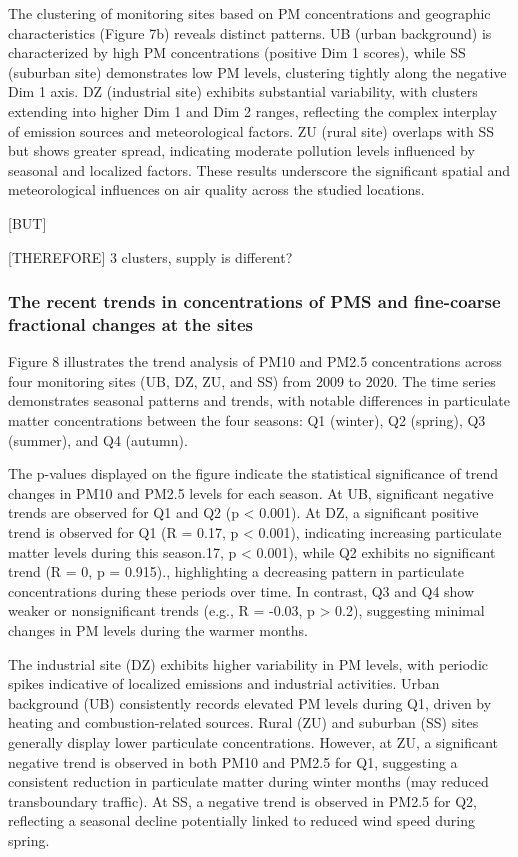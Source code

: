 \documentclass[
  11pt,
]{article}
\begin{document}
The clustering of monitoring sites based on PM concentrations and
geographic characteristics (Figure 7b) reveals distinct patterns. UB
(urban background) is characterized by high PM concentrations (positive
Dim 1 scores), while SS (suburban site) demonstrates low PM levels,
clustering tightly along the negative Dim 1 axis. DZ (industrial site)
exhibits substantial variability, with clusters extending into higher
Dim 1 and Dim 2 ranges, reflecting the complex interplay of emission
sources and meteorological factors. ZU (rural site) overlaps with SS but
shows greater spread, indicating moderate pollution levels influenced by
seasonal and localized factors. These results underscore the significant
spatial and meteorological influences on air quality across the studied
locations.

{[}BUT{]}

{[}THEREFORE{]} 3 clusters, supply is different?

\subsubsection{The recent trends in concentrations of PMS and
fine-coarse fractional changes at the
sites}\label{the-recent-trends-in-concentrations-of-pms-and-fine-coarse-fractional-changes-at-the-sites}

Figure 8 illustrates the trend analysis of PM10 and PM2.5 concentrations
across four monitoring sites (UB, DZ, ZU, and SS) from 2009 to 2020. The
time series demonstrates seasonal patterns and trends, with notable
differences in particulate matter concentrations between the four
seasons: Q1 (winter), Q2 (spring), Q3 (summer), and Q4 (autumn).

The p-values displayed on the figure indicate the statistical
significance of trend changes in PM10 and PM2.5 levels for each season.
At UB, significant negative trends are observed for Q1 and Q2 (p
\textless{} 0.001). At DZ, a significant positive trend is observed for
Q1 (R = 0.17, p \textless{} 0.001), indicating increasing particulate
matter levels during this season.17, p \textless{} 0.001), while Q2
exhibits no significant trend (R = 0, p = 0.915)., highlighting a
decreasing pattern in particulate concentrations during these periods
over time. In contrast, Q3 and Q4 show weaker or nonsignificant trends
(e.g., R = -0.03, p \textgreater{} 0.2), suggesting minimal changes in
PM levels during the warmer months.

The industrial site (DZ) exhibits higher variability in PM levels, with
periodic spikes indicative of localized emissions and industrial
activities. Urban background (UB) consistently records elevated PM
levels during Q1, driven by heating and combustion-related sources.
Rural (ZU) and suburban (SS) sites generally display lower particulate
concentrations. However, at ZU, a significant negative trend is observed
in both PM10 and PM2.5 for Q1, suggesting a consistent reduction in
particulate matter during winter months (may reduced transboundary
traffic). At SS, a negative trend is observed in PM2.5 for Q2,
reflecting a seasonal decline potentially linked to reduced wind speed
during spring.
\end{document}
